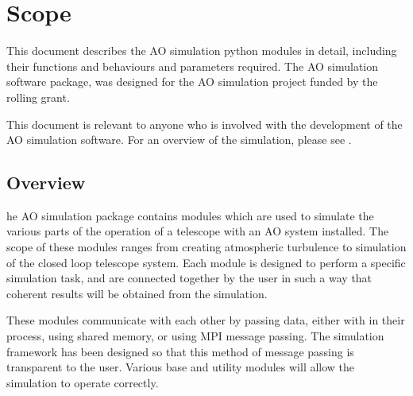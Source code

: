 \documentclass{article}
\begin{document}


\section{Scope}
This document describes the AO simulation python modules in detail,
including their functions and behaviours and parameters required.  The
AO simulation software package, was designed for the AO simulation
project funded by the rolling grant.  

This document is relevant to anyone who is involved with the
development of the AO simulation software.  For an overview of the
simulation, please see \citet{overview}.


\subsection{Overview}
he AO simulation package contains modules which are used to simulate
the various parts of the operation of a telescope with an AO system
installed.  The scope of these modules ranges from creating
atmospheric turbulence to simulation of the closed loop telescope
system.  Each module is designed to perform a specific simulation
task, and are connected together by the user in such a way that
coherent results will be obtained from the simulation.

These modules communicate with each other by passing data, either with
in their process, using shared memory, or using MPI message passing.
The simulation framework has been designed so that this method of
message passing is transparent to the user.  Various base and utility
modules will allow the simulation to operate correctly.



\end{document}
